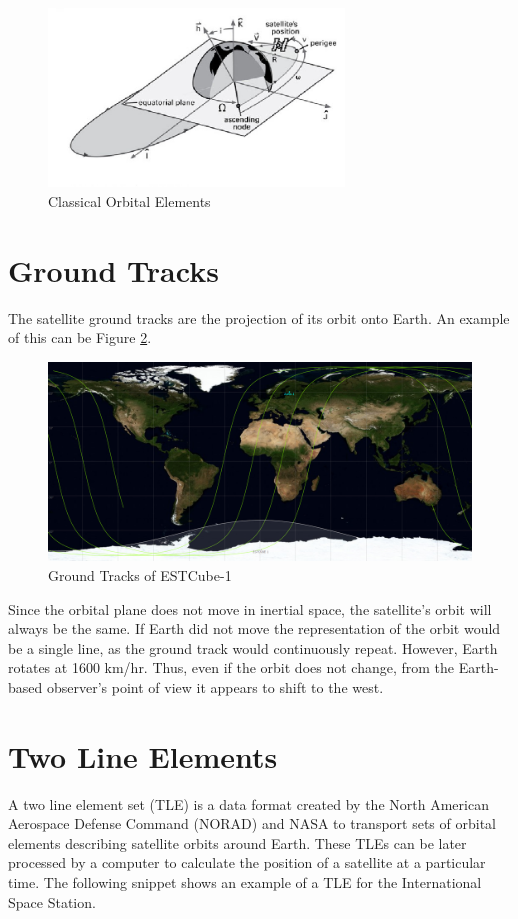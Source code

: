 \begin{figure}[H]
\centerline{\includegraphics[width=0.7\textwidth]{images/COEs.png}}
\caption{Classical Orbital Elements \cite{IntAstr}}
\label{f2.3}
\end{figure}
\pagebreak
\section{Ground Tracks}\label{2.3}

The satellite ground tracks are the projection of its orbit onto Earth. An example of this can be Figure \ref{f2.4}.

\begin{figure}[H]
\centerline{\includegraphics[width=1\textwidth]{images/GroundTracks.png}}
\caption{Ground Tracks of ESTCube-1}
\label{f2.4}
\end{figure}

Since the orbital plane does not move in inertial space, the satellite's orbit will always be the same. If Earth did not move the representation of the orbit would be a single line, as the ground track would continuously repeat. However, Earth rotates at 1600 km/hr. Thus, even if the orbit does not change, from the Earth-based observer's point of view it appears to shift to the west.

\section{Two Line Elements}\label{2.4}
A two line element set (TLE) is a data format created by the North American Aerospace Defense Command (NORAD) and NASA to transport sets of orbital elements describing satellite orbits around Earth. These TLEs can be later processed by a computer to calculate the position of a satellite at a particular time.
\newpage
The following snippet shows an example of a TLE for the International Space Station.

